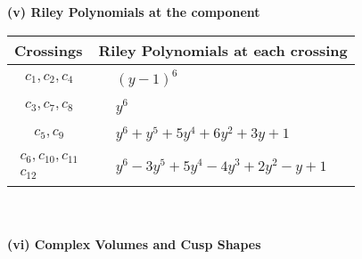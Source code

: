 \documentclass[1p]{elsarticle_modified}
\theoremstyle{definition}
\begin{document}
\newpage\renewcommand{\arraystretch}{1}
\flushleft \textbf{(v) Riley Polynomials at the component}\newline \\
\begin{tabular}{m{50pt}|m{274pt}}
Crossings & \hspace{64pt}Riley Polynomials at each crossing \\
\hline $$\begin{aligned}c_{1},c_{2},c_{4}\end{aligned}$$&$\begin{aligned}
&(y-1)^6
\end{aligned}$\\
\hline $$\begin{aligned}c_{3},c_{7},c_{8}\end{aligned}$$&$\begin{aligned}
&y^6
\end{aligned}$\\
\hline $$\begin{aligned}c_{5},c_{9}\end{aligned}$$&$\begin{aligned}
&y^6+y^5+5 y^4+6 y^2+3 y+1
\end{aligned}$\\
\hline $$\begin{aligned}c_{6},c_{10},c_{11}\\c_{12}\end{aligned}$$&$\begin{aligned}
&y^6-3 y^5+5 y^4-4 y^3+2 y^2- y+1
\end{aligned}$\\
\hline
\end{tabular}\\~\\
\newpage\flushleft \textbf{(vi) Complex Volumes and Cusp Shapes}
\end{document}
